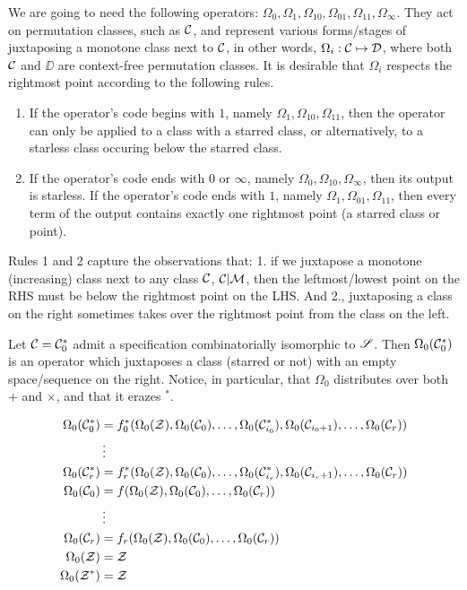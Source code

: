 \message{ !name(thesis.tex)}\documentclass[12pt, a4paper, twoside]{report}
\begin{document}
We are going to need the following operators: $\Omega_0, \Omega_1, \Omega_{10}, \Omega_{01}, \Omega_{11}, \Omega_\infty$. They act on permutation classes, such as $\mathcal{C}$, and represent various forms/stages of juxtaposing a monotone class next to $\mathcal{C}$, in other words, $\Omega_i: \mathcal{C} \mapsto \mathcal{D}$, where both $\mathcal{C}$ and $\DD$ are context-free permutation classes. It is desirable that $\Omega_i$ respects the rightmost point according to the following rules.
\begin{enumerate}
\item If the operator's code begins with $1$, namely $\Omega_1,\Omega_{10},\Omega_{11}$, then the operator can only be applied to a class with a starred class, or alternatively, to a starless class occuring below the starred class.
\item If the operator's code ends with $0$ or $\infty$, namely $\Omega_0, \Omega_{10}, \Omega_\infty$, then its output is starless. If the operator's code ends with $1$, namely $\Omega_1, \Omega_{01}, \Omega_{11}$, then every term of the output contains exactly one rightmost point (a starred class or point).
\end{enumerate}
Rules 1 and 2 capture the observations that: 1. if we juxtapose a monotone (increasing) class next to any class $\mathcal{C}$, $\mathcal{C}|\mathcal{M}$, then the leftmost/lowest point on the RHS must be below the rightmost point on the LHS. And 2., juxtaposing a class on the right sometimes takes over the rightmost point from the class on the left.

Let $\mathcal{C} = \mathcal{C}_0^*$ admit a specification combinatorially isomorphic to $\mathscr{S}$. Then $\Omega_0(\mathcal{C}_0^*)$ is an operator which juxtaposes a class (starred or not) with an empty space/sequence on the right. Notice, in particular, that $\Omega_0$ distributes over both $+$ and $\times$, and that it erazes ${}^*$. 

\begin{align*}
  \Omega_0(\mathcal{C}_0^*) &= f_0^*(\Omega_0(\mathcal{Z}),\Omega_0(\mathcal{C}_0),\ldots,\Omega_0(\mathcal{C}_{i_0}^*),\Omega_0(\mathcal{C}_{i_0+1}),\ldots,\Omega_0(\mathcal{C}_r))\\
       &\vdots\\
  \Omega_0(\mathcal{C}_r^*) &= f_r^*(\Omega_0(\mathcal{Z}),\Omega_0(\mathcal{C}_0),\ldots,\Omega_0(\mathcal{C}_{i_r}^*),\Omega_0(\mathcal{C}_{i_r+1}),\ldots,\Omega_0(\mathcal{C}_r))\\
  \Omega_0(\mathcal{C}_0) &= f(\Omega_0(\mathcal{Z}),\Omega_0(\mathcal{C}_0),\ldots,\Omega_0(\mathcal{C}_r))\\
       &\vdots\\
  \Omega_0(\mathcal{C}_r) &= f_r(\Omega_0(\mathcal{Z}),\Omega_0(\mathcal{C}_0),\ldots,\Omega_0(\mathcal{C}_r))\\
  \Omega_0(\mathcal{Z}) &= \mathcal{Z}\\
  \Omega_0(\mathcal{Z}^*) &= \mathcal{Z}
\end{align*}
\end{document}
